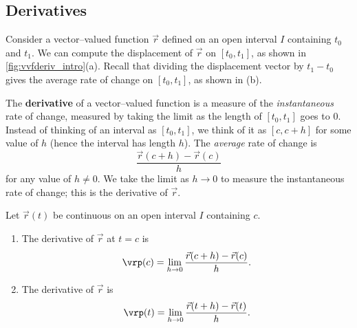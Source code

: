 \subsection*{Derivatives}

Consider a vector--valued function $\vec r$ defined on an open interval $I$ containing $t_0$ and $t_1$. We can compute the displacement of $\vec r$ on $[t_0,t_1]$, as shown in \autoref{fig:vvfderiv_intro}(a). Recall that dividing the displacement vector by $t_1-t_0$ gives the average rate of change on $[t_0,t_1]$, as shown in (b).

\begin{lxfigure}
\label{fig:vvfderiv_intro}
\end{lxfigure}

The \textbf{derivative} of a vector--valued function is a measure of the \emph{instantaneous} rate of change, measured by taking the limit as the length of $[t_0,t_1]$ goes to 0. Instead of thinking of an interval as $[t_0,t_1]$, we think of it as $[c,c+h]$ for some value of $h$ (hence the interval has length $h$).  The \emph{average} rate of change is 
$$\frac{\vec r(c+h)-\vec r(c)}{h}$$
for any value of $h\neq0$. We take the limit as $h\to0$ to measure the instantaneous rate of change; this is the derivative of $\vec r$.


{Let $\vec r(t)$ be continuous on an open interval $I$ containing $c$.
\begin{enumerate}
	\item The derivative of $\vec r$ at $t=c$ is
	$$ \vrp (c) = \lim_{h\to 0} \frac{\vec r(c+h) - \vec r(c)}{h}.$$
	\item	The derivative of $\vec r$ is
	$$ \vrp (t) = \lim_{h\to 0} \frac{\vec r(t+h) - \vec r(t)}{h}.$$
\end{enumerate}}


